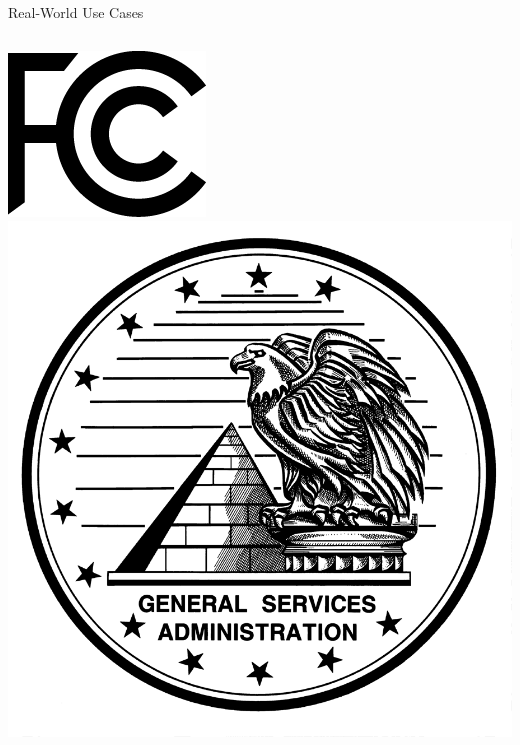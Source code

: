 \documentclass[compress]{beamer}
\begin{document}
\begin{frame}{Real-World Use Cases}

\begin{columns}
  \includegraphics[width=\linewidth]{topic_models/fcc-logo}
  \includegraphics[width=\linewidth]{topic_models/gsa}

\end{columns}
\end{frame}
\end{document}
